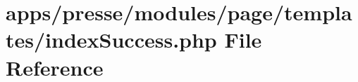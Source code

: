 \hypertarget{presse_2modules_2page_2templates_2index_success_8php}{\section{apps/presse/modules/page/templates/index\-Success.php File Reference}
\label{presse_2modules_2page_2templates_2index_success_8php}
}
